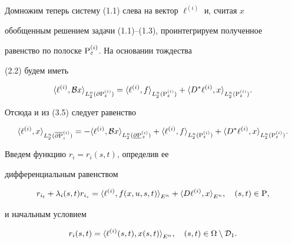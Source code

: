 Домножим теперь систему (1.1) слева на вектор $\ell^{(i)}$ и, считая $x$


обобщенным решением задачи (1.1)--(1.3), проинтегрируем полученное


равенство по полоске ${\P}_{\varepsilon}^{(i)}$. На основании тождества


(2.2) будем иметь


$$


\la\ell^{(i)},{\cal B}x \ra_{L_2^n(\partial {\P}_{\varepsilon}^{(i)})} = 


\la \ell^{(i)},f \ra_{L_2^n({\P}_{\varepsilon}^{(i)})} +


\la D^{*} \ell^{(i)},x \ra_{L_2^n({\P}_{\varepsilon}^{(i)})}. 


$$


Отсюда и из (3.5) следует равенство


\begin{equation}


\la\ell^{(i)}, x \ra_{L_2^n(\overline{\partial{\P}}_{\varepsilon}^{(i)})} = 


- \la \ell^{(i)},{\cal B}x \ra_{L_2^n


(\underline{\partial {\P}}{}_{\,\varepsilon}^{(i)})} +


\la \ell^{(i)}, f \ra_{L_2^n({\P}_{\varepsilon}^{(i)})} + 


\la D^{*} \ell^{(i)},x \ra_{L_2^n({\P}_{\varepsilon}^{(i)})}. 


\end{equation}





Введем функцию $r_{i} = r_{i}(s,t)$, определив ее


дифференциальным равенством


\begin{equation}


r_{i_t} + \lambda_{i}(s,t) r_{i_s} =


{\la \ell^{(i)}, f(x,u,s,t) \ra}_{E^n} +


{\la D\ell^{(i)},x \ra}_{E^n},\quad (s,t) \in {\P},


\end{equation}


и начальным условием


\begin{equation}


r_{i}(s,t) = {\la \ell^{(i)}(s,t), x(s,t) \ra}_{E^n},\quad


(s,t) \in \Omega \setminus {\cal D}_1.


\end{equation}


